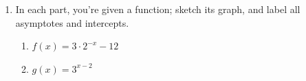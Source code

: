 \documentclass{article}
\begin{document}
\begin{enumerate}
\begin{enumerate}
\begin{enumerate}
    \item
      \begin{problem}[\stretch{0.35}]
        $5^{-c}$
      \end{problem}

      \begin{solution}
          $5^{-c}=\dfrac{1}{5^c} = \dfrac{1}{7}$
      \end{solution}

    \item
      \begin{problem}[\stretch{0.35}]
        $5^{3b}$
      \end{problem}

      \begin{solution}
          $5^{3b} = (5^b)^3 = \Big(\dfrac{1}{3}\Big)^3 = \dfrac{1}{27}$
      \end{solution}

    \item
      \begin{problem}[\nstretch{0.35}]
        $5^{2a + b - c}$
      \end{problem}

      \begin{solution}
               $5^{2a + b - c} = \dfrac{(5a)^2 \cdot 5^b}{5^c} = \dfrac{4 \cdot \frac{1}{3}}{7} = \dfrac{4}{21}$
      \end{solution}

    \end{enumerate}

  \end{enumerate}

\item  In each part, you're given a function; sketch its graph, and label all asymptotes and intercepts. 
  \begin{enumerate}
  \item
    \begin{problem}[\vfill]
      $f(x) = 3 \cdot 2^{-x} - 12$
    \end{problem}

  \item
    \begin{problem}[\vfill]
      $g(x) = 3^{x - 2}$
    \end{problem}

  \end{enumerate}

\end{enumerate}
\end{document}

